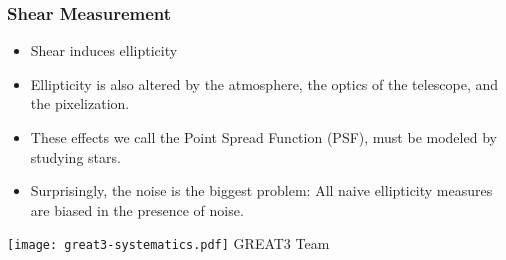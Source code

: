 \documentclass{beamer}
\begin{document}
\frame
{
    \frametitle{Shear Measurement}

    \begin{itemize}

        \item Shear induces ellipticity

        \item Ellipticity is also altered by the atmosphere, the optics
            of the telescope, and the pixelization.
        
        \item These effects we call the Point Spread Function (PSF),
            must be modeled by studying stars.

        \item Surprisingly, the noise is the biggest problem:  All
            naive ellipticity measures are biased in the presence of
            noise.

    \end{itemize}
    \begin{center}
        \texttt{[image: great3-systematics.pdf]}
        \newline
        {\tiny GREAT3 Team}
    \end{center}
}
\end{document}
